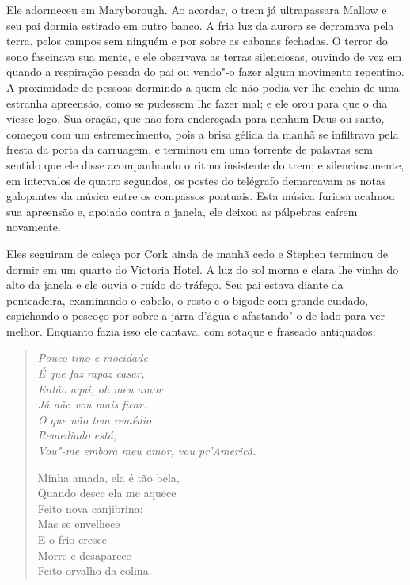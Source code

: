 Ele adormeceu em Maryborough. Ao acordar, o trem já ultrapassara Mallow
e seu pai dormia estirado em outro banco. A fria luz da aurora se
derramava pela terra, pelos campos sem ninguém e por sobre as cabanas
fechadas. O terror do sono fascinava sua mente, e ele observava as
terras silenciosas, ouvindo de vez em quando a respiração pesada do pai
ou vendo"-o fazer algum movimento repentino. A proximidade de pessoas
dormindo a quem ele não podia ver lhe enchia de uma estranha apreensão,
como se pudessem lhe fazer mal; e ele orou para que o dia viesse logo.
Sua oração, que não fora endereçada para nenhum Deus ou santo, começou
com um estremecimento, pois a brisa gélida da manhã se infiltrava pela
fresta da porta da carruagem, e terminou em uma torrente de palavras
sem sentido que ele disse acompanhando o ritmo insistente do trem; e
silenciosamente, em intervalos de quatro segundos, os postes do
telégrafo demarcavam as notas galopantes da música entre os compassos
pontuais. Esta música furiosa acalmou sua apreensão e, apoiado contra a
janela, ele deixou as pálpebras caírem novamente.

Eles seguiram de caleça por Cork ainda de manhã cedo e Stephen terminou
de dormir em um quarto do Victoria Hotel. A luz do sol morna e clara
lhe vinha do alto da janela e ele ouvia o ruído do tráfego. Seu pai
estava diante da penteadeira, examinando o cabelo, o rosto e o bigode
com grande cuidado, espichando o pescoço por sobre a jarra
d’água e afastando"-o de lado para ver melhor. Enquanto
fazia isso ele cantava, com sotaque e fraseado antiquados:

\begin{verse}\itshape
Pouco tino e mocidade\\
É que faz rapaz casar,\\
Então aqui, oh meu amor\\
Já não vou mais ficar.\\
O que não tem remédio\\
Remediado está,\\
Vou"-me embora meu amor, vou pr’Americá.

Minha amada, ela é tão bela,\\
Quando desce ela me aquece\\
Feito nova canjibrina;\\ 
Mas se envelhece\\
E o frio cresce\\
Morre e desaparece\\
Feito orvalho da colina.
\end{verse}

